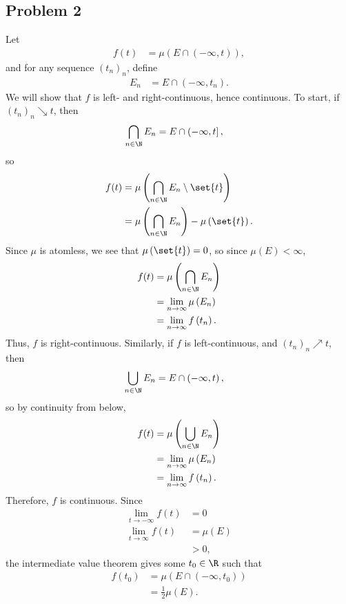 \documentclass[10pt]{mypackage}
\begin{document}
\subsection{Problem 2}%
Let
\begin{align*}
  f(t) &= \mu\left( E\cap \left( -\infty,t \right) \right),
\end{align*}
and for any sequence $\left( t_n \right)_n$, define
\begin{align*}
  E_n &= E\cap \left( -\infty,t_n \right).
\end{align*}
We will show that $f$ is left- and right-continuous, hence continuous. To start, if $\left( t_n \right)_n\searrow t$, then
\begin{align*}
  \bigcap_{n\in \N} E_n &= E\cap \left( -\infty,t \right],
\end{align*}
so
\begin{align*}
  f(t) &= \mu\left( \bigcap_{n\in \N} E_n\setminus \set{t} \right)\\
       &= \mu\left( \bigcap_{n\in \N} E_n \right) -\mu\left( \set{t} \right).
\end{align*}
Since $\mu$ is atomless, we see that $\mu\left( \set{t} \right) = 0$, so since $\mu\left( E \right) < \infty$,
\begin{align*}
  f(t) &= \mu\left( \bigcap_{n\in\N} E_n \right)\\
       &= \lim_{n\rightarrow\infty} \mu\left( E_n \right)\\
       &= \lim_{n\rightarrow\infty} f\left( t_n \right).
\end{align*}
Thus, $f$ is right-continuous. Similarly, if $f$ is left-continuous, and $\left( t_n \right)_n \nearrow t$, then
\begin{align*}
  \bigcup_{n\in \N} E_n &= E\cap \left( -\infty,t \right),
\end{align*}
so by continuity from below,
\begin{align*}
  f(t) &= \mu\left( \bigcup_{n\in\N} E_n \right)\\
       &= \lim_{n\rightarrow\infty} \mu\left( E_n \right)\\
       &= \lim_{n\rightarrow\infty} f\left( t_n \right).
\end{align*}
Therefore, $f$ is continuous. Since
\begin{align*}
  \lim_{t\rightarrow -\infty} f(t) &= 0\\
  \lim_{t\rightarrow\infty} f(t) &= \mu\left( E \right)\\
                                 &> 0,
\end{align*}
the intermediate value theorem gives some $t_0\in \R$ such that
\begin{align*}
  f\left(t_0\right) &= \mu\left( E\cap \left( -\infty,t_0 \right) \right)\\
                    &= \frac{1}{2}\mu\left( E \right).
\end{align*}
\end{document}

